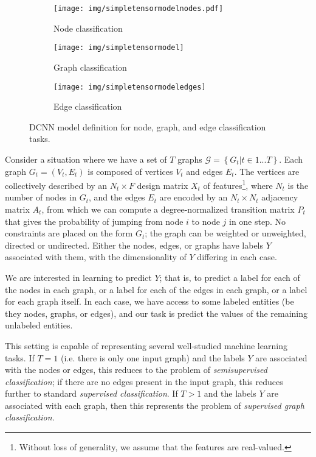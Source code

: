 \documentclass{article}
\begin{document}
\begin{figure}[t]
    \centering
    \begin{subfigure}[t]{0.3\textwidth}
        \centering
        \texttt{[image: img/simpletensormodelnodes.pdf]}
        \caption{Node classification}
        \label{fig:tensormodelnode}
    \end{subfigure}
    \begin{subfigure}[t]{0.3\textwidth}
        \centering
        \texttt{[image: img/simpletensormodel]}
        \caption{Graph classification}
        \label{fig:tensormodelgraph}
    \end{subfigure}
    \begin{subfigure}[t]{0.3\textwidth}
        \centering
        \texttt{[image: img/simpletensormodeledges]}
        \caption{Edge classification}
        \label{fig:tensormodeledges}
    \end{subfigure}
    \caption{DCNN model definition for node, graph, and edge classification tasks.}
    \label{fig:tensormodel}
\end{figure}

Consider a situation where we have a set of $T$ graphs $\mathcal{G} = \left\{G_t | t \in 1 ... T \right\}$. Each graph $G_t = (V_t, E_t)$ is composed of vertices $V_t$ and edges $E_t$.  The vertices are collectively described by an $N_t \times F$ design matrix $X_t$ of features\footnote{Without loss of generality, we assume that the features are real-valued.}, where $N_t$ is the number of nodes in $G_t$, and the edges $E_t$ are encoded by an $N_t \times N_t$ adjacency matrix $A_t$, from which we can compute a degree-normalized transition matrix $P_t$ that gives the probability of jumping from node $i$ to node $j$ in one step.  No constraints are placed on the form $G_t$; the graph can be weighted or unweighted, directed or undirected.   Either the nodes, edges, or graphs have labels $Y$ associated with them, with the dimensionality of $Y$ differing in each case.

We are interested in learning to predict $Y$; that is, to predict a label for each of the nodes in each graph, or a label for each of the edges in each graph, or a label for each graph itself.  In each case, we have access to some labeled entities (be they nodes, graphs, or edges), and our task is predict the values of the remaining unlabeled entities.

This setting is capable of representing several well-studied machine learning tasks.  If $T=1$ (i.e. there is only one input graph) and the labels $Y$ are associated with the nodes or edges, this reduces to the problem of \emph{semisupervised classification}; if there are no edges present in the input graph, this reduces further to standard \emph{supervised classification}.  If $T>1$ and the labels $Y$ are associated with each graph, then this represents the problem of \emph{supervised graph classification}.
\end{document}

